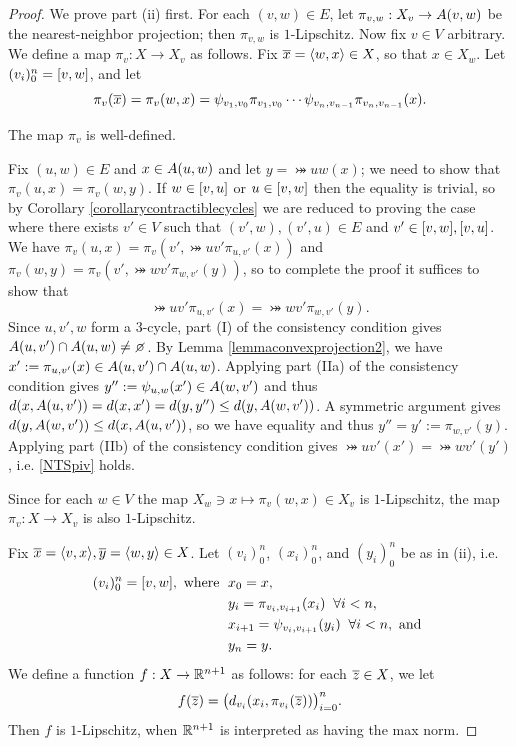 \begin{proof}
We prove part (ii) first. For each $(v,w)\in E$, let $\pi_{v,w}:X_v\to A(v,w)$ be the nearest-neighbor projection; then $\pi_{v,w}$ is $1$-Lipschitz. Now fix $v\in V$ arbitrary. We define a map $\pi_v:X\to X_v$ as follows. Fix $\overline x = \langle w,x\rangle\in X$, so that $x\in X_w$. Let $(v_i)_0^n = [v,w]$, and let
\[
\pi_v(\overline x) = \pi_v(w,x) = \psi_{v_1,v_0}\pi_{v_1,v_0}\cdots\psi_{v_n,v_{n - 1}}\pi_{v_n,v_{n - 1}}(x).
\]
\begin{claim}
\label{claimpiv}
The map $\pi_v$ is well-defined.
\end{claim}
\begin{subproof}
Fix $(u,w)\in E$ and $x\in A(u,w)$ and let $y = \bij uw(x)$; we need to show that $\pi_v(u,x) = \pi_v(w,y)$. If $w\in [v,u]$ or $u\in [v,w]$ then the equality is trivial, so by Corollary \ref{corollarycontractiblecycles} we are reduced to proving the case where there exists $v'\in V$ such that $(v',w),(v',u)\in E$ and $v'\in [v,w],[v,u]$. We have $\pi_v(u,x) = \pi_v(v',\bij u{v'}\pi_{u,v'}(x))$ and $\pi_v(w,y) = \pi_v(v',\bij w{v'}\pi_{w,v'}(y))$, so to complete the proof it suffices to show that
\begin{equation}
\label{NTSpiv}
\bij u{v'}\pi_{u,v'}(x) = \bij w{v'}\pi_{w,v'}(y).
\end{equation}
Since $u,v',w$ form a $3$-cycle, part (I) of the consistency condition gives $\set u{v'}\cap \set uw\neq\emptyset$. By Lemma \ref{lemmaconvexprojection2}, we have $x' := \pi_{u,v'}(x)\in A(u,v')\cap A(u,w)$. Applying part (IIa) of the consistency condition gives $y'' := \psi_{u,w}(x') \in A(w,v')$ and thus $d(x,A(u,v')) = d(x,x') = d(y,y'') \leq d(y,A(w,v'))$. A symmetric argument gives $d(y,A(w,v')) \leq d(x,A(u,v'))$, so we have equality and thus $y'' = y' := \pi_{w,v'}(y)$. Applying part (IIb) of the consistency condition gives $\bij u{v'}(x') = \bij w{v'}(y')$, i.e. \eqref{NTSpiv} holds.
\end{subproof}

Since for each $w\in V$ the map $X_w\ni x\mapsto \pi_v(w,x)\in X_v$ is $1$-Lipschitz, the map $\pi_v:X\to X_v$ is also $1$-Lipschitz.

Fix $\overline x = \langle v,x\rangle,\overline y = \langle w,y\rangle\in X$. Let $(v_i)_0^n$, $(x_i)_0^n$, and $(y_i)_0^n$ be as in (ii), i.e.
\begin{align*}
(v_i)_0^n = [v,w], \textup{ where } &\; x_0 = x,\\ 
&\; y_i = \pi_{v_i,v_{i + 1}}(x_i)  \;\;\forall i < n,\\ 
&\; x_{i + 1} = \psi_{v_i,v_{i + 1}}(y_i) \;\;\forall i < n, \textup{ and }\\ 
&\; y_n = y.
\end{align*}
We define a function $f:X\to \R^{n + 1}$ as follows: for each $\overline z\in X$, we let
\[
f(\overline z) = \big(d_{v_i}(x_i,\pi_{v_i}(\overline z))\big)_{i = 0}^n.
\]
Then $f$ is $1$-Lipschitz, when $\R^{n + 1}$ is interpreted as having the max norm.


\end{proof}
